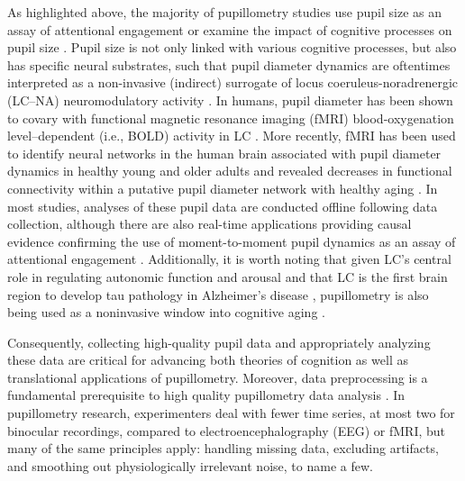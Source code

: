 As highlighted above, the majority of pupillometry studies use pupil size as an assay of attentional engagement or examine the impact of cognitive processes on pupil size \parencite{kristjansson2009detecting,madore2020memory,vandenbrink2016pupil}. Pupil size is not only linked with various cognitive processes, but also has specific neural substrates, such that pupil diameter dynamics are oftentimes interpreted as a non-invasive (indirect) surrogate of locus coeruleus-noradrenergic (LC–NA) neuromodulatory activity \parencites{he2020age}{joshi2016relationships}[cf.][]{megemont2022pupil}. In humans, pupil diameter has been shown to covary with functional magnetic resonance imaging (fMRI) blood-oxygenation level–dependent (i.e., BOLD) activity in LC \parencite{murphy2014pupil}. More recently, fMRI has been used to identify neural networks in the human brain associated with pupil diameter dynamics in healthy young and older adults and revealed decreases in functional connectivity within a putative pupil diameter network with healthy aging \parencite{wu2025probing}. In most studies, analyses of these pupil data are conducted offline following data collection, although there are also real-time applications providing causal evidence confirming the use of moment-to-moment pupil dynamics as an assay of attentional engagement \parencite{keene2022pupillometry,meissner2024self,schwartz2024real,schwartz2025attending}. Additionally, it is worth noting that given LC’s central role in regulating autonomic function and arousal \parencite{poe2020locus,samuels2008functional} and that LC is the first brain region to develop tau pathology in Alzheimer’s disease \parencite{betts2019locus,braak2011alzheimer,holper2022tau,spires2014intersection}, pupillometry is also being used as a noninvasive window into cognitive aging \parencite{elhaj2024pupillometry,kim2024pupillometry,piquado2010pupillometry}.

Consequently, collecting high-quality pupil data and appropriately analyzing these data are critical for advancing both theories of cognition as well as translational applications of pupillometry. Moreover, data preprocessing is a fundamental prerequisite to high quality pupillometry data analysis \parencite{fink2024from,hershman2024processing,kret2019preprocessing,laeng2024methodological,mathot2023methods,steinhauer2022publication,vanrij2019analyzing}. In pupillometry research, experimenters deal with fewer time series, at most two for binocular recordings, compared to electroencephalography (EEG) or fMRI, but many of the same principles apply: handling missing data, excluding artifacts, and smoothing out physiologically irrelevant noise, to name a few.

